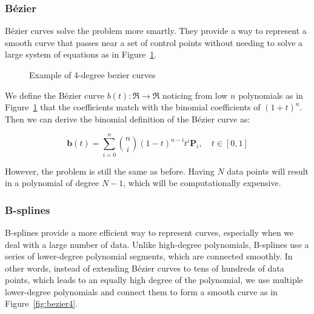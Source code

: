 \documentclass[12pt,a4paper]{article}
\begin{document}
\subsubsection{Bézier}
Bézier curves solve the problem more smartly. They provide a way to represent a smooth curve that passes near a set of control points without needing to solve a large system of equations as in Figure~\ref{fig:bezier2}.   
\begin{figure}[H]
    \centering
    \hfill
    \caption{Example of 4-degree bezier curves}
    \label{fig:bezier2}
\end{figure}


We define the Bézier curve $b(t): \Re \to \Re$ noticing from low $n$ polynomials as in Figure~\ref{fig:bezier2} that the coefficients match with the binomial coefficients of $(1+t)^n$. Then we can derive the binomial definition of the Bézier curve as:

\[
\mathbf{b}(t) = \sum_{i=0}^n \binom{n}{i} (1-t)^{n-i} t^i \mathbf{P}_i, \quad t \in [0, 1]
\]

However, the problem is still the same as before. Having $N$ data points will result in a polynomial of degree $N-1$, which will be computationally expensive.

\subsubsection{B-splines}
B-splines provide a more efficient way to represent curves, especially when we deal with a large number of data. Unlike high-degree polynomials, B-splines use a series of lower-degree polynomial segments, which are connected smoothly.
In other words, instead of extending Bézier curves to tens of hundreds of data points, which leads to an equally high degree of the polynomial, we use multiple lower-degree polynomials and connect them to form a smooth curve as in Figure~\ref{fig:bezier4}.
\end{document}
